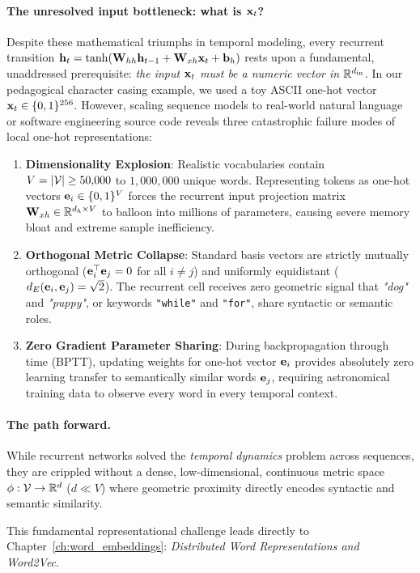\documentclass[../../main.tex]{subfiles}
\begin{document}
\paragraph{The unresolved input bottleneck: what is $\mathbf{x}_t$?}
Despite these mathematical triumphs in temporal modeling, every recurrent transition $\mathbf{h}_t = \tanh(\mathbf{W}_{hh} \mathbf{h}_{t-1} + \mathbf{W}_{xh} \mathbf{x}_t + \mathbf{b}_h)$ rests upon a fundamental, unaddressed prerequisite: \emph{the input $\mathbf{x}_t$ must be a numeric vector in $\mathbb{R}^{d_{\text{in}}}$}. In our pedagogical character casing example, we used a toy ASCII one-hot vector $\mathbf{x}_t \in \{0, 1\}^{256}$. However, scaling sequence models to real-world natural language or software engineering source code reveals three catastrophic failure modes of local one-hot representations:
\begin{enumerate}
    \item \textbf{Dimensionality Explosion}: Realistic vocabularies contain $V = |\mathcal{V}| \ge 50{,}000$ to $1{,}000{,}000$ unique words. Representing tokens as one-hot vectors $\mathbf{e}_i \in \{0, 1\}^V$ forces the recurrent input projection matrix $\mathbf{W}_{xh} \in \mathbb{R}^{d_h \times V}$ to balloon into millions of parameters, causing severe memory bloat and extreme sample inefficiency.
    \item \textbf{Orthogonal Metric Collapse}: Standard basis vectors are strictly mutually orthogonal ($\mathbf{e}_i^\top \mathbf{e}_j = 0$ for all $i \ne j$) and uniformly equidistant ($d_E(\mathbf{e}_i, \mathbf{e}_j) = \sqrt{2}$). The recurrent cell receives zero geometric signal that \textit{"dog"} and \textit{"puppy"}, or keywords \texttt{"while"} and \texttt{"for"}, share syntactic or semantic roles.
    \item \textbf{Zero Gradient Parameter Sharing}: During backpropagation through time (BPTT), updating weights for one-hot vector $\mathbf{e}_i$ provides absolutely zero learning transfer to semantically similar words $\mathbf{e}_j$, requiring astronomical training data to observe every word in every temporal context.
\end{enumerate}

\paragraph{The path forward.}
While recurrent networks solved the \emph{temporal dynamics} problem across sequences, they are crippled without a dense, low-dimensional, continuous metric space $\phi: \mathcal{V} \to \mathbb{R}^d$ ($d \ll V$) where geometric proximity directly encodes syntactic and semantic similarity.

This fundamental representational challenge leads directly to Chapter~\ref{ch:word_embeddings}: \emph{Distributed Word Representations and Word2Vec}.
\end{document}
